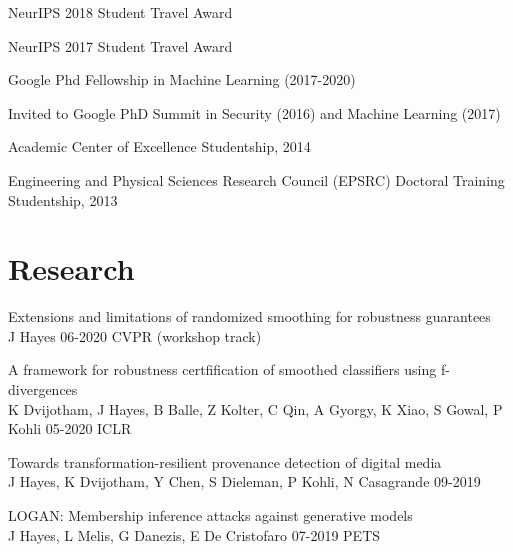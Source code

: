 \documentclass[margin,line]{res}
\begin{document}
\begin{resume}


NeurIPS 2018 Student Travel Award\newline

\vspace*{-3mm}

NeurIPS 2017 Student Travel Award\newline

\vspace*{-3mm}

Google Phd Fellowship in Machine Learning (2017-2020)\newline

\vspace*{-3mm}

\noindent Invited to Google PhD Summit in Security (2016) and Machine
Learning (2017)\newline

\vspace*{-3mm}

Academic Center of Excellence Studentship, 2014\newline

\vspace*{-3mm}

Engineering and Physical Sciences Research Council (EPSRC) Doctoral
Training Studentship, 2013


\section{\sc Research}

Extensions and limitations of randomized smoothing for robustness guarantees\\
J Hayes 06-2020 CVPR (workshop track)  

A framework for robustness certfification of smoothed classifiers using f-divergences\\
K Dvijotham, J Hayes, B Balle, Z Kolter, C Qin, A Gyorgy, K Xiao, S Gowal, P Kohli 05-2020 ICLR

Towards transformation-resilient provenance detection of digital media\\
J Hayes, K Dvijotham, Y Chen, S Dieleman, P Kohli, N Casagrande 09-2019  

LOGAN: Membership inference attacks against generative models\\
J Hayes, L Melis, G Danezis, E De Cristofaro 07-2019 PETS  


\end{resume}
\end{document}
